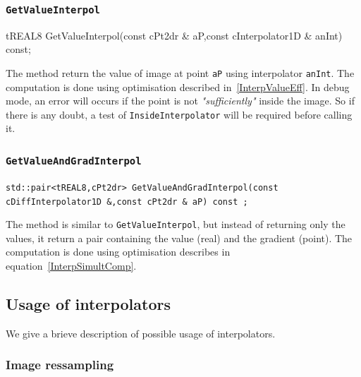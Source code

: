 
\subsubsection{{\tt GetValueInterpol}}

{tREAL8 GetValueInterpol(const cPt2dr \& aP,const cInterpolator1D \& anInt) const;}

The method return the value of image at point {\tt aP} using interpolator {\tt anInt}. 
The computation is done using optimisation described in~\ref{InterpValueEff}.
In debug mode, an error will occurs if the point is not \emph{"sufficiently"} inside 
the image. So if there is any doubt, a test of {\tt InsideInterpolator} will be required before calling it.


\subsubsection{{\tt GetValueAndGradInterpol}}

\label{Method:GetValueAndGradInterpol}

{\tt std::pair<tREAL8,cPt2dr> GetValueAndGradInterpol(const cDiffInterpolator1D \&,const cPt2dr \& aP) const ;}

The method is similar to {\tt GetValueInterpol}, but instead of returning only the values, it 
return a pair containing the value (real) and the gradient (point).
The computation is done using optimisation describes in equation~\ref{InterpSimultComp}.



\subsection{Usage of interpolators}


We give a brieve description of possible usage of interpolators.


\subsubsection{Image ressampling}

